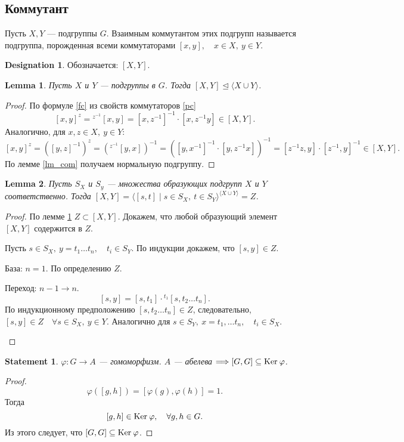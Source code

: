 \documentclass[11pt]{book}
\renewcommand{\ker}{{\mathop{\text{\rm Ker}}}\:}
\theoremstyle{definition}
\theoremstyle{plain}
\theoremstyle{plain}
\newtheorem{lm}{Lemma}
\newtheorem{st}{Statement}
\theoremstyle{definition}
\newtheorem*{name}{Designation}
\theoremstyle{remark}
\begin{document}
\subsection{Коммутант}
\begin{defn}
    Пусть $ X, Y $ --- подгруппы  $ G$. {\sf Взаимным коммутантом} этих подгрупп называется подгруппа, порожденная всеми коммутаторами  $ [x, y], \quad x \in X, ~ y \in Y$.
    \begin{name}
	Обозначается:  $ [X, Y]$.
    \end{name}
\end{defn}
\begin{lm}\label{lm_tri}
    Пусть $ X$ и  $ Y$ --- подгруппы в  $ G$. Тогда  $ [X, Y] \trianglelefteq \langle X \cup Y \rangle$.
\end{lm}
\begin{proof}
    По формуле \ref{fc} из свойств коммутаторов \ref{pc}
    \[
	[x, y]^{z } = {^{z^{-1}}\![x, y] } = [x, z ^{-1}]^{-1} \cdot [x , z^{-1}y] \in [X, Y]
    .\]
    Аналогично, для  $ x, z \in X, ~ y \in Y$:
    \[
	[x, y]^{z} = \left( [y, z]^{-1} \right) ^{z} = \left( {^{z^{-1}}[y, x]} \right)^{-1} = \left( [y, x^{-1}]^{-1} \cdot [y, z^{-1}x] \right)^{-1} = [z^{-1}z, y] \cdot [z^{-1}, y]^{-1} \in [X, Y]
    .\]
    По лемме \ref{lm_com} получаем нормальную подгруппу.
\end{proof}
\begin{lm}\label{lm_sx}
    Пусть  $ S_{X}$ и $ S_{y}$ --- множества образующих подгрупп $ X$ и  $ Y$ соответственно. Тогда  $ [X, Y] = \langle [s, t] \mid s \in S_X , ~ t \in S_Y \rangle ^{\langle X \cup Y \rangle} = Z$.
\end{lm}
\begin{proof}
    По лемме \ref{lm_tri}  $ Z \subset [X, Y]$. Докажем, что любой образующий элемент $ [X, Y]$ содержится в  $ Z$.

    Пусть  $ s \in S_X, ~ y = t_1 \ldots t_n, \quad t_i \in S_Y$. По индукции докажем, что $ [s, y] \in Z$.
    \begin{description}[noitemsep]
	\item База: $ n = 1$. По определению  $ Z$.
	\item  Переход:  $ n - 1 \to  n$. \[
		[s, y] = [s, t_1]\cdot {\!\!^{t_1} [s, t_2 \ldots t_n]}
	    .\]
	    По индукционному предположению $ [s, t_2 \ldots t_n] \in Z$, следовательно, $ [s, y] \in Z \quad \forall s \in S_X, ~ y \in  Y$. Аналогично для $ s \in S_Y, ~ x = t_1, \ldots t_n, \quad t_i \in S_X$.
    \end{description}
\end{proof}
\begin{st}
    $\varphi : G \to  A$ --- гомоморфизм.
    $A$ --- абелева $\Longrightarrow [G, G] \subseteq \ker \varphi $.
\end{st}
\begin{proof}
    \[
	\varphi ([g, h]) = [\varphi (g), \varphi (h)] = 1
    .\]
    Тогда \[
	[g, h] \in  \ker \varphi , \quad \forall g, h \in  G
    .\]
    Из этого следует, что $[G, G] \subseteq  \ker \varphi $.
\end{proof}
\end{document}
